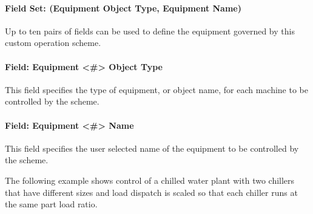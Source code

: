 \paragraph{Field Set: (Equipment Object Type, Equipment Name)}\label{field-set-equipment-object-type-equipment-name}

Up to ten pairs of fields can be used to define the equipment governed by this custom operation scheme.

\paragraph{Field: Equipment \textless{}\#\textgreater{} Object Type}\label{field-equipment-object-type-000}

This field specifies the type of equipment, or object name, for each machine to be controlled by the scheme.

\paragraph{Field: Equipment \textless{}\#\textgreater{} Name}\label{field-equipment-name-000}

This field specifies the user selected name of the equipment to be controlled by the scheme.

The following example shows control of a chilled water plant with two chillers that have different sizes and load dispatch is scaled so that each chiller runs at the same part load ratio.

